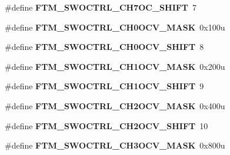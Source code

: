 \begin{DoxyCompactItemize}
\item 
\hypertarget{group___f_t_m___register___masks_gae136ec9e72708b9da0aec24219804269}{}\#define {\bfseries F\+T\+M\+\_\+\+S\+W\+O\+C\+T\+R\+L\+\_\+\+C\+H7\+O\+C\+\_\+\+S\+H\+I\+F\+T}~7\label{group___f_t_m___register___masks_gae136ec9e72708b9da0aec24219804269}

\item 
\hypertarget{group___f_t_m___register___masks_ga83766e89cee45d6c03318d8031258d17}{}\#define {\bfseries F\+T\+M\+\_\+\+S\+W\+O\+C\+T\+R\+L\+\_\+\+C\+H0\+O\+C\+V\+\_\+\+M\+A\+S\+K}~0x100u\label{group___f_t_m___register___masks_ga83766e89cee45d6c03318d8031258d17}

\item 
\hypertarget{group___f_t_m___register___masks_gaa2983e96c36fff64f21bf488473f902d}{}\#define {\bfseries F\+T\+M\+\_\+\+S\+W\+O\+C\+T\+R\+L\+\_\+\+C\+H0\+O\+C\+V\+\_\+\+S\+H\+I\+F\+T}~8\label{group___f_t_m___register___masks_gaa2983e96c36fff64f21bf488473f902d}

\item 
\hypertarget{group___f_t_m___register___masks_gab32bd89d8a7fe488b8bdbbfc753a05aa}{}\#define {\bfseries F\+T\+M\+\_\+\+S\+W\+O\+C\+T\+R\+L\+\_\+\+C\+H1\+O\+C\+V\+\_\+\+M\+A\+S\+K}~0x200u\label{group___f_t_m___register___masks_gab32bd89d8a7fe488b8bdbbfc753a05aa}

\item 
\hypertarget{group___f_t_m___register___masks_ga277368cadfcfb45d0f011cfa5bba13c5}{}\#define {\bfseries F\+T\+M\+\_\+\+S\+W\+O\+C\+T\+R\+L\+\_\+\+C\+H1\+O\+C\+V\+\_\+\+S\+H\+I\+F\+T}~9\label{group___f_t_m___register___masks_ga277368cadfcfb45d0f011cfa5bba13c5}

\item 
\hypertarget{group___f_t_m___register___masks_gaa48e37bd5004ccb2bce43692fa0c1a80}{}\#define {\bfseries F\+T\+M\+\_\+\+S\+W\+O\+C\+T\+R\+L\+\_\+\+C\+H2\+O\+C\+V\+\_\+\+M\+A\+S\+K}~0x400u\label{group___f_t_m___register___masks_gaa48e37bd5004ccb2bce43692fa0c1a80}

\item 
\hypertarget{group___f_t_m___register___masks_ga000183d4ecd255b5497ec73ea76f5cbc}{}\#define {\bfseries F\+T\+M\+\_\+\+S\+W\+O\+C\+T\+R\+L\+\_\+\+C\+H2\+O\+C\+V\+\_\+\+S\+H\+I\+F\+T}~10\label{group___f_t_m___register___masks_ga000183d4ecd255b5497ec73ea76f5cbc}

\item 
\hypertarget{group___f_t_m___register___masks_gaba02b117cc313564b3f2d67aa238a3ef}{}\#define {\bfseries F\+T\+M\+\_\+\+S\+W\+O\+C\+T\+R\+L\+\_\+\+C\+H3\+O\+C\+V\+\_\+\+M\+A\+S\+K}~0x800u\label{group___f_t_m___register___masks_gaba02b117cc313564b3f2d67aa238a3ef}


\end{DoxyCompactItemize}
